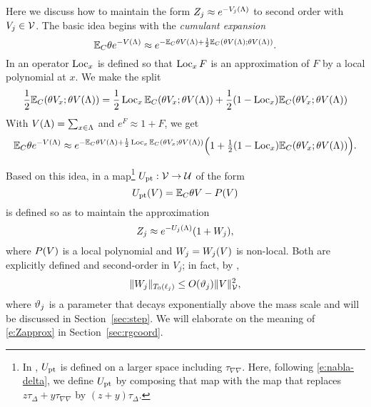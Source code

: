 Here we discuss how to maintain the form $Z_j \approx e^{-V_j(\Lambda)}$ to
second order with $V_j\in\mathcal{V}$. The basic idea begins with the \emph{cumulant
expansion}
\begin{equation}
\mathbb{E}_C \theta e^{-V(\Lambda)}
	\approx
e^{-\mathbb{E}_C \theta V(\Lambda) + \scriptstyle{\frac12} \mathbb{E}_C (\theta V(\Lambda); \theta V(\Lambda))}.
\end{equation}
In \cite{BS-rg-loc} an operator $\operatorname{Loc}_x$ is defined so that $\operatorname{Loc}_x F$ is an
approximation of $F$ by a local polynomial at $x$. We make the split
\begin{equation}
\frac12 \mathbb{E}_C (\theta V_x; \theta V(\Lambda))
	=
\frac12 \operatorname{Loc}_x \mathbb{E}_C (\theta V_x; \theta V(\Lambda))
	+
\frac12 (1 - \operatorname{Loc}_x) \mathbb{E}_C (\theta V_x; \theta V(\Lambda))
\end{equation}
With $V(\Lambda) = \sum_{x\in\Lambda}$ and $e^F \approx 1 + F$, we get
\begin{equation}
\mathbb{E}_C \theta e^{-V(\Lambda)}
	\approx
e^{-\mathbb{E}_C \theta V(\Lambda)
	+
\scriptstyle{\frac12} \operatorname{Loc}_x \mathbb{E}_C (\theta V_x; \theta V(\Lambda))}
\Big(1 + \tfrac12 (1 - \operatorname{Loc}_x) \mathbb{E}_C (\theta V_x; \theta V(\Lambda))\Big).
\end{equation}

Based on this idea, in \cite{BBS-rg-pt}
a map\footnote{In \cite{BBS-rg-pt}, $U_{\rm pt}$ is defined on a
larger space including $\tau_{\nabla\nabla}$. Here, following \eqref{e:nabla-delta},
we define $U_{\rm pt}$ by composing that map with the map that replaces
$z \tau_\Delta + y \tau_{\nabla\nabla}$ by $(z + y) \tau_\Delta$.}
$U_{\rm pt} : \mathcal{V}\rightarrow\mathcal{U}$ of the form
\begin{equation}
\label{e:Vpt-def}
U_{\rm pt}(V) = \mathbb{E}_C\theta V - P(V)
\end{equation}
is defined so as to maintain the approximation
\begin{equation}
\label{e:Zapprox}
Z_j \approx e^{-U_j(\Lambda)} (1 + W_j),
\end{equation}
where $P(V)$ is a local polynomial and $W_j = W_j(V)$ is non-local.
Both are explicitly defined and second-order in $V_j$;
in fact, by \cite[\eqref{IE-e:W-logwish}]{BS-rg-IE},
\begin{equation}
\label{e:Wbilinbd}
\|W_j\|_{T_0(\ell_j)}
	\le
O(\vartheta_j) \|V\|_{\mathcal{V}}^2,
\end{equation}
where $\vartheta_j$ is a parameter that decays exponentially above the mass scale
and will be discussed in Section~\ref{sec:step}. We will elaborate on the  meaning
of \eqref{e:Zapprox} in Section~\ref{sec:rgcoord}.


